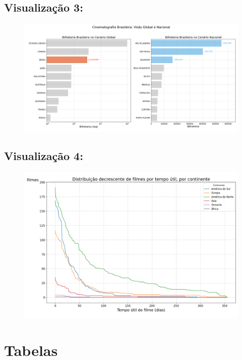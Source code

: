 \documentclass{article}
\begin{document}
\subsection*{Visualização 3:}
\begin{figure}[H]
    \centerline{\includegraphics[width = \linewidth]{img/Figure_3.png}}
\end{figure}
\lipsum[1-2] %

\subsection*{Visualização 4:}
\begin{figure}[H]
    \centerline{\includegraphics[width = \linewidth]{img/Figure_4.png}}
\end{figure}
\lipsum[1-2] %

\section*{Tabelas}
\end{document}
